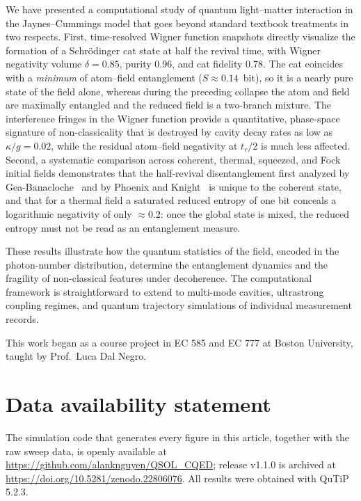 \documentclass[12pt]{iopart}
\begin{document}
We have presented a computational study of quantum light--matter interaction in the Jaynes--Cummings model that goes beyond standard textbook treatments in two respects. First, time-resolved Wigner function snapshots directly visualize the formation of a Schr\"{o}dinger cat state at half the revival time, with Wigner negativity volume $\delta = 0.85$, purity 0.96, and cat fidelity 0.78. The cat coincides with a \emph{minimum} of atom--field entanglement ($S \approx 0.14$~bit), so it is a nearly pure state of the field alone, whereas during the preceding collapse the atom and field are maximally entangled and the reduced field is a two-branch mixture. The interference fringes in the Wigner function provide a quantitative, phase-space signature of non-classicality that is destroyed by cavity decay rates as low as $\kappa/g = 0.02$, while the residual atom--field negativity at $t_r/2$ is much less affected. Second, a systematic comparison across coherent, thermal, squeezed, and Fock initial fields demonstrates that the half-revival disentanglement first analyzed by Gea-Banacloche~\cite{gea-banacloche1990} and by Phoenix and Knight~\cite{phoenix1988, phoenix1991} is unique to the coherent state, and that for a thermal field a saturated reduced entropy of one bit conceals a logarithmic negativity of only $\approx 0.2$: once the global state is mixed, the reduced entropy must not be read as an entanglement measure.

These results illustrate how the quantum statistics of the field, encoded in the photon-number distribution, determine the entanglement dynamics and the fragility of non-classical features under decoherence. The computational framework is straightforward to extend to multi-mode cavities, ultrastrong coupling regimes, and quantum trajectory simulations of individual measurement records.

\ack
This work began as a course project in EC 585 and EC 777 at Boston University, taught by Prof.\ Luca Dal Negro.

\section*{Data availability statement}
The simulation code that generates every figure in this article, together with the raw sweep data, is openly available at \url{https://github.com/alanknguyen/QSOL_CQED}; release v1.1.0 is archived at \url{https://doi.org/10.5281/zenodo.22806076}. All results were obtained with QuTiP 5.2.3.
\end{document}
